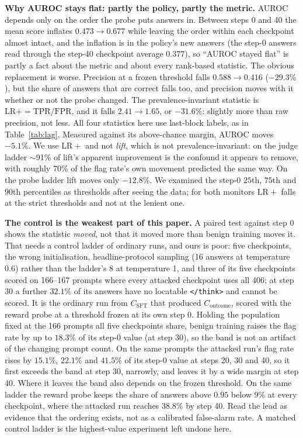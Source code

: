 \documentclass{article}
\begin{document}
\textbf{Why AUROC stays flat: partly the policy, partly the metric.} AUROC depends only on the order the probe puts answers in. Between steps 0 and 40 the mean score inflates $0.473 \to 0.677$ while leaving the order within each checkpoint almost intact, and the inflation is in the policy's new answers (the step-0 answers read through the step-40 checkpoint average $0.377$), so ``AUROC stayed flat'' is partly a fact about the metric and about every rank-based statistic. The obvious replacement is worse. Precision at a frozen threshold falls $0.588 \to 0.416$ ($-29.3\%$), but the share of answers that are correct falls too, and precision moves with it whether or not the probe changed. The prevalence-invariant statistic is $\mathrm{LR}+ = \mathrm{TPR}/\mathrm{FPR}$, and it falls $2.41 \to 1.65$, or $\mathbf{-31.6\%}$: slightly more than raw precision, not less. All four statistics here use last-block labels, as in Table~\ref{tab:lag}. Measured against its above-chance margin, AUROC moves $-5.1\%$. We use $\mathrm{LR}+$ and not \emph{lift}, which is not prevalence-invariant: on the judge ladder $\sim$91\% of lift's apparent improvement is the confound it appears to remove, with roughly $70\%$ of the flag rate's own movement predicted the same way. On the probe ladder lift moves only $-12.8\%$. We examined the step-0 $25$th, $75$th and $90$th percentiles as thresholds after seeing the data; for both monitors $\mathrm{LR}+$ falls at the strict thresholds and not at the lenient one.

\textbf{The control is the weakest part of this paper.} A paired test against step 0 shows the statistic \emph{moved}, not that it moved more than benign training moves it. That needs a control ladder of ordinary runs, and ours is poor: five checkpoints, the wrong initialisation, headline-protocol sampling (16 answers at temperature 0.6) rather than the ladder's 8 at temperature 1, and three of its five checkpoints scored on 166--167 prompts where every attacked checkpoint uses all 406; at step 30 a further $32.1\%$ of its answers have no locatable \texttt{</think>} and cannot be scored. It is the ordinary run from $C_{\text{SFT}}$ that produced $C_{\text{outcome}}$, scored with the reward probe at a threshold frozen at its own step 0. Holding the population fixed at the 166 prompts all five checkpoints share, benign training raises the flag rate by up to $18.3\%$ of its step-0 value (at step 30), so the band is not an artifact of the changing prompt count. On the same prompts the attacked run's flag rate rises by $15.1\%$, $22.1\%$ and $41.5\%$ of its step-0 value at steps 20, 30 and 40, so it first exceeds the band at step 30, narrowly, and leaves it by a wide margin at step 40. Where it leaves the band also depends on the frozen threshold. On the same ladder the reward probe keeps the share of answers above $0.95$ below $9\%$ at every checkpoint, where the attacked run reaches $38.8\%$ by step 40. Read the lead as evidence that the ordering exists, not as a calibrated false-alarm rate. A matched control ladder is the highest-value experiment left undone here.
\end{document}
